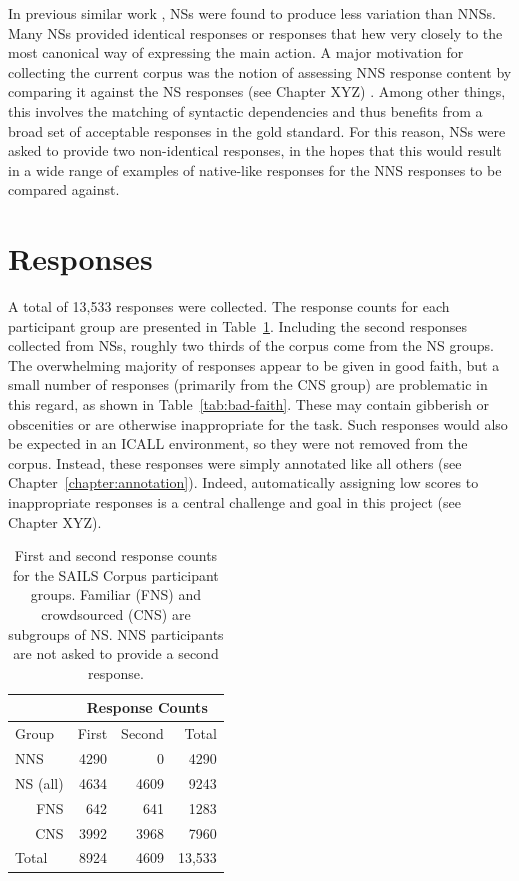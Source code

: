 In previous similar work \citep{king:dickinson:13},
NSs were found to produce less variation than NNSs. Many NSs provided identical responses or responses that hew very closely to the most canonical way of expressing the main action. A major motivation for collecting the current corpus was the notion of assessing NNS response content by comparing it against the NS responses (see Chapter XYZ) . Among other things, this involves the matching of syntactic dependencies and thus benefits from a broad set of acceptable responses in the gold standard. For this reason, NSs were asked to provide two non-identical responses, in the hopes that this would result in a wide range of examples of native-like responses for the NNS responses to be compared against.

\section{Responses}
\label{sec:responses}

A total of 13,533 responses were collected. The response counts for each participant group are presented in Table~\ref{tab:response-counts}. Including the second responses collected from NSs, roughly two thirds of the corpus come from the NS groups. The overwhelming majority of responses appear to be given in good faith, but a small number of responses (primarily from the CNS group) are problematic in this regard, as shown in Table~\ref{tab:bad-faith}. These may contain gibberish or obscenities or are otherwise inappropriate for the task. Such responses would also be expected in an ICALL environment, so they were not removed from the corpus. Instead, these responses were simply annotated like all others (see Chapter~\ref{chapter:annotation}). Indeed, automatically assigning low scores to inappropriate responses is a central challenge and goal in this project (see Chapter XYZ).

\begin{table}[htb!]
\begin{center}
\begin{tabular}{|l||r|r||r|}
\hline
& \multicolumn{3}{|c|}{Response Counts} \\
\hline
 Group & First & Second & Total \\
\hline
\hline
NNS & 4290 & 0 & 4290 \\
\hline
\hline
NS (all) & 4634 & 4609 & 9243 \\ %
\hline
\multicolumn{1}{|r||}{FNS} & 642 & 641 & 1283 \\ 
\hline
\multicolumn{1}{|r||}{CNS} & 3992 & 3968 & 7960 \\
\hline
\hline
Total & 8924 & 4609 & 13,533 \\
\hline
\end{tabular}
\caption{\label{tab:response-counts} First and second response counts for the SAILS Corpus participant groups. Familiar (FNS) and crowdsourced (CNS) are subgroups of NS. NNS participants are not asked to provide a second response.}
\end{center}
\end{table}


